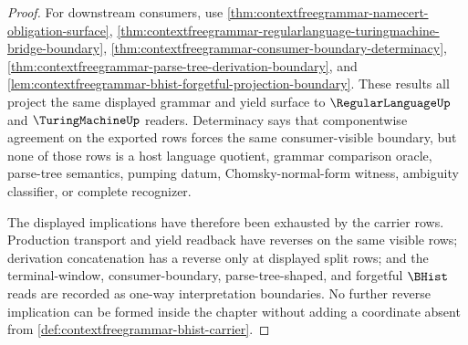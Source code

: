 \begin{proof}
For downstream consumers, use
\autoref{thm:contextfreegrammar-namecert-obligation-surface},
\autoref{thm:contextfreegrammar-regularlanguage-turingmachine-bridge-boundary},
\autoref{thm:contextfreegrammar-consumer-boundary-determinacy},
\autoref{thm:contextfreegrammar-parse-tree-derivation-boundary}, and
\autoref{lem:contextfreegrammar-bhist-forgetful-projection-boundary}. These
results all project the same displayed grammar and yield surface to
$\RegularLanguageUp$ and $\TuringMachineUp$ readers. Determinacy says that
componentwise agreement on the exported rows forces the same consumer-visible
boundary, but none of those rows is a host language quotient, grammar
comparison oracle, parse-tree semantics, pumping datum, Chomsky-normal-form
witness, ambiguity classifier, or complete recognizer.

The displayed implications have therefore been exhausted by the carrier rows.
Production transport and yield readback have reverses on the same visible rows;
derivation concatenation has a reverse only at displayed split rows; and the
terminal-window, consumer-boundary, parse-tree-shaped, and forgetful $\BHist$
reads are recorded as one-way interpretation boundaries. No further reverse
implication can be formed inside the chapter without adding a coordinate absent
from \autoref{def:contextfreegrammar-bhist-carrier}.
\end{proof}
